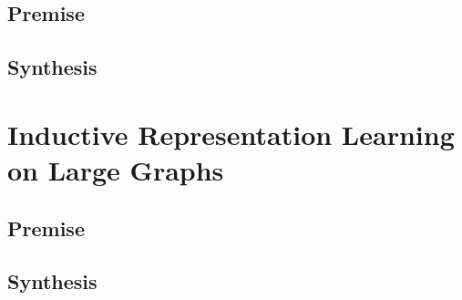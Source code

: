 \documentclass[12pt]{extarticle}
\begin{document}
\subsection{Premise}
\subsection{Synthesis}

\section{Inductive Representation Learning on Large Graphs}
\subsection{Premise}
\subsection{Synthesis}



\end{document}
